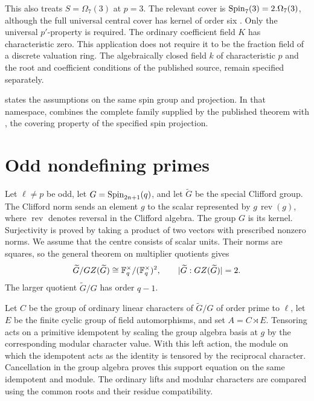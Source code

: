 This also treats $S=\Omega_7(3)$ at $p=3$. The relevant cover is
$\operatorname{Spin}_7(3)=2.\Omega_7(3)$, although the full universal central cover
has kernel of order six \cite[Tables~24.2--24.3 and
Remark~24.19]{MalleTesterman2011}. Only the universal $p'$-property is
required. The ordinary coefficient field $K$ has characteristic zero.
This application does not require it to be the fraction field of a discrete
valuation ring. The algebraically closed field $k$ of characteristic $p$
and the root and coefficient conditions of the published source, remain
specified separately.

\begin{implementation}
 states the assumptions
on the same spin group and projection. In that namespace,
 combines the complete family supplied by the published
theorem with , the covering property of the
specified spin projection.
\end{implementation}

\section{Odd nondefining primes}

Let $\ell\ne p$ be odd, let $G=\operatorname{Spin}_{2n+1}(q)$, and let
$\widetilde G$ be the special Clifford group. The Clifford norm sends an
element $g$ to the scalar represented by $g\,\operatorname{rev}(g)$, where
$\operatorname{rev}$ denotes reversal in the Clifford algebra. The group
$G$ is its kernel. Surjectivity is proved by taking a
product of two vectors with prescribed nonzero norms. We assume that the centre consists of scalar units.
Their norms are squares, so the general theorem on multiplier quotients
gives
\[
 \widetilde G/GZ(\widetilde G)
 \cong \mathbb F_q^\times/(\mathbb F_q^\times)^2,
 \qquad |\widetilde G:GZ(\widetilde G)|=2.
\]
The larger quotient $\widetilde G/G$ has order $q-1$.

Let $C$ be the group of ordinary linear characters of
$\widetilde G/G$ of order prime to $\ell$, let $E$ be the finite cyclic group of field automorphisms, and set $A=C\rtimes E$. Tensoring acts on
a primitive idempotent by scaling the group algebra basis at $g$ by the
corresponding modular character value. With this left action, the
module on which the idempotent acts as the identity is tensored by the
reciprocal character. Cancellation in the group algebra proves this support
equation on the same idempotent and module. The ordinary lifts and modular
characters are compared using the common roots and their residue
compatibility.

